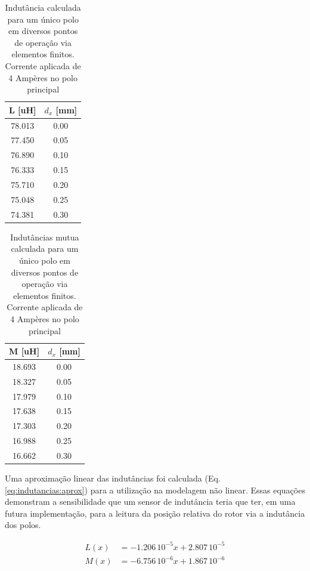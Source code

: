 \begin{table}[ht!]
	\centering
	\begin{tabular}{c c}
        L [uH]  & $d_x$ [mm] \\
        \hline \hline               
        78.013 & 0.00 \\
        77.450 & 0.05 \\
        76.890 & 0.10 \\
        76.333 & 0.15 \\
        75.710 & 0.20 \\
        75.048 & 0.25 \\
        74.381 & 0.30       
	\end{tabular} 
	\caption{Indutância calculada para um único polo em diversos pontos de operação via elementos finitos. Corrente aplicada de 4 Ampères no polo principal}
	\label{tab:dinamica:indutancia} 
\end{table} 

\begin{table}[ht!]
	\centering
	\begin{tabular}{c c}
        M [uH]  & $d_x$ [mm] \\
        \hline \hline               
         18.693 & 0.00 \\
         18.327 & 0.05 \\
         17.979 & 0.10 \\
         17.638 & 0.15 \\
         17.303 & 0.20 \\
         16.988 & 0.25 \\
         16.662 & 0.30       
	\end{tabular} 
	\caption{Indutâncias mutua calculada para um único polo em diversos pontos de operação via elementos finitos. Corrente aplicada de 4 Ampères no polo principal}
	\label{tab:dinamica:indutancia:mutua} 
\end{table} 

Uma aproximação linear das indutâncias foi calculada (Eq. \ref{eq:indutancias:aprox}) para a utilização na modelagem não linear. Essas equações demonstram a sensibilidade que um sensor de indutância teria que ter, em uma futura implementação, para a leitura da posição relativa do rotor via a indutância dos polos.

\begin{align}
	L(x) &= -1.206 \,10^{-5} x + 2.807 \, 10^{-5} \\
	M(x) &= -6.756 \,10^{-6} x + 1.867 \, 10^{-6} 
	\label{eq:indutancias:aprox}
\end{align} 


